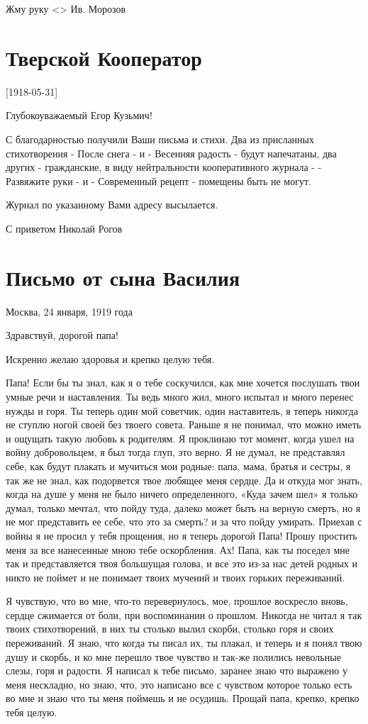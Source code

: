 \documentclass[]{memoir}
\begin{document}
Жму руку <> Ив. Морозов



\section{Тверской Кооператор}
        [1918-05-31]
        
Глубокоуважаемый Егор Кузьмич!

С благодарностью получили Ваши письма и стихи. Два из присланных стихотворения - После снега - и - Весенняя радость - будут напечатаны, два других - гражданские, в виду нейтральности кооперативного журнала - - Развяжите руки - и - Современный рецепт - помещены быть не могут.

Журнал по указанному Вами адресу высылается.

С приветом
Николай Рогов


\section{Письмо от сына Василия}

Москва, 24 января, 1919 года

Здравствуй, дорогой папа!

Искренно желаю здоровья и крепко целую тебя.

Папа! Если бы ты знал, как я о тебе соскучился, как мне хочется послушать твои умные речи и наставления. 
Ты ведь много жил, много испытал и много перенес нужды и горя. 
Ты теперь один мой советчик, один наставитель, я теперь никогда не ступлю ногой своей без твоего совета.
Раньше я не понимал, что можно иметь и ощущать такую любовь к родителям.
Я проклинаю тот момент, когда ушел на войну добровольцем, я был тогда глуп, это верно.
Я не думал, не представлял себе, как будут плакать и мучиться мои родные:  папа, мама, братья и сестры, я так же не знал, как подорвется твое любящее меня сердце.
Да и откуда мог знать, когда на душе у меня не было ничего определенного, «Куда зачем шел» я только думал, только мечтал, что пойду туда, далеко может быть на верную смерть, но я не мог представить ее себе, что это за смерть? и за что пойду умирать. Приехав с войны я не просил у тебя прощения, но я теперь дорогой Папа! Прошу простить меня за все нанесенные мною тебе оскорбления. 
Ах! Папа, как ты поседел мне так и представляется твоя большущая голова, и все это из-за нас детей родных и никто не поймет и не понимает твоих мучений и твоих горьких переживаний.

Я чувствую, что во мне, что-то перевернулось, мое, прошлое воскресло вновь, сердце сжимается от боли, при воспоминании о прошлом. Никогда не читал я так твоих стихотворений, в них ты столько вылил скорби, столько горя и своих переживаний.
Я знаю, что когда ты писал их, ты плакал, и теперь и я понял твою душу и скорбь, и ко мне перешло твое чувство и так-же полились невольные слезы, горя и радости. 
Я написал к тебе письмо, заранее знаю что выражено у меня нескладно, но знаю, что, это написано все с чувством которое только есть во мне  и знаю что ты меня поймешь и не осудишь. Прощай папа, крепко, крепко тебя целую.
\end{document}
